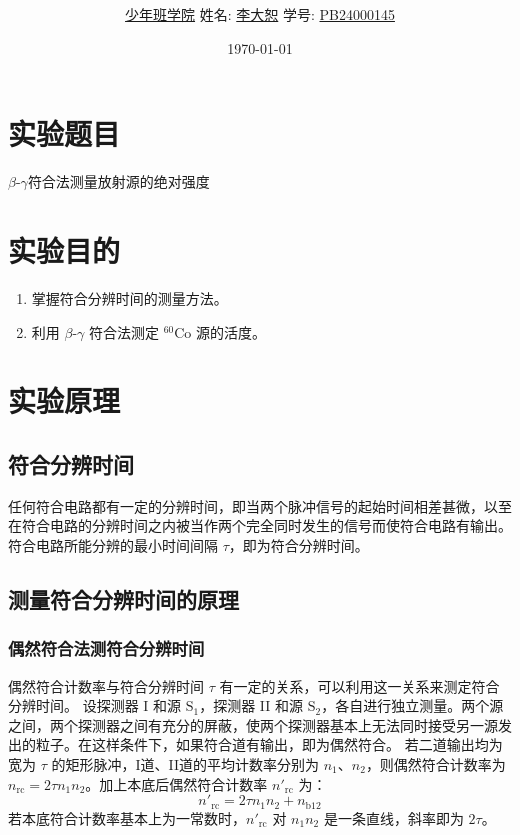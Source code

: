 \documentclass[12pt,a4paper]{article}
\title{\Huge{\textbf{\uuline{预\ 习\ 报\ 告}}}}
\author{\uline{少年班学院} \quad 姓名: \uline{李大恕} \quad 学号: \uline{PB24000145}}
\date{\today}
\begin{document}
\maketitle

\section{实验题目}
$\beta$-$\gamma$符合法测量放射源的绝对强度

\section{实验目的}
\begin{enumerate}
    \item 掌握符合分辨时间的测量方法。
    \item 利用 $\beta$-$\gamma$ 符合法测定 $^{60}\text{Co}$ 源的活度。
\end{enumerate}

\section{实验原理}
\subsection{符合分辨时间}
任何符合电路都有一定的分辨时间，即当两个脉冲信号的起始时间相差甚微，以至在符合电路的分辨时间之内被当作两个完全同时发生的信号而使符合电路有输出。符合电路所能分辨的最小时间间隔 $\tau$，即为符合分辨时间。

\subsection{测量符合分辨时间的原理}
\subsubsection{偶然符合法测符合分辨时间}
偶然符合计数率与符合分辨时间 $\tau$ 有一定的关系，可以利用这一关系来测定符合分辨时间。
设探测器 I 和源 $\text{S}_1$，探测器 II 和源 $\text{S}_2$，各自进行独立测量。两个源之间，两个探测器之间有充分的屏蔽，使两个探测器基本上无法同时接受另一源发出的粒子。在这样条件下，如果符合道有输出，即为偶然符合。
若二道输出均为宽为 $\tau$ 的矩形脉冲，I道、II道的平均计数率分别为 $n_1$、$n_2$，则偶然符合计数率为 $n_{\text{rc}} = 2\tau n_1 n_2$。加上本底后偶然符合计数率 $n'_{\text{rc}}$ 为：
\begin{equation}
    n'_{\text{rc}} = 2\tau n_1 n_2 + n_{\text{b}12}
\end{equation}
若本底符合计数率基本上为一常数时，$n'_{\text{rc}}$ 对 $n_1 n_2$ 是一条直线，斜率即为 $2\tau$。
\end{document}
